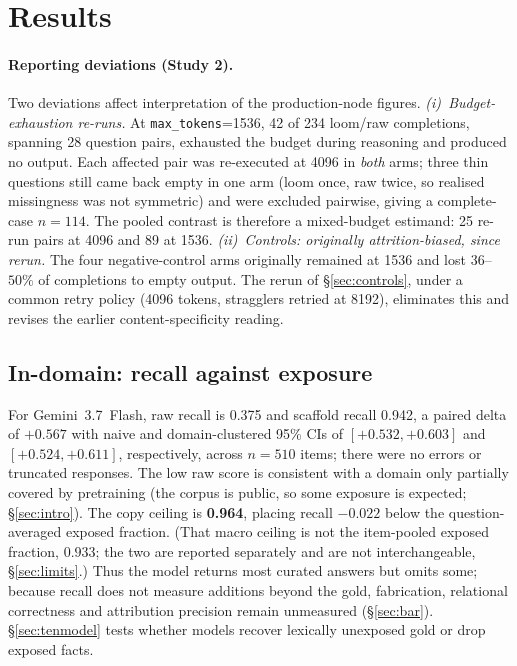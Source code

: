 \documentclass[10pt,twocolumn]{article}
\begin{document}
\section{Results}\label{sec:results}
\paragraph{Reporting deviations (Study 2).} Two deviations affect interpretation of the production-node figures. \emph{(i)~Budget-exhaustion re-runs.} At \texttt{max\_tokens}=1536, 42 of 234 loom/raw completions, spanning 28 question pairs, exhausted the budget during reasoning and produced no output. Each affected pair was re-executed at 4096 in \emph{both} arms; three thin questions still came back empty in one arm (loom once, raw twice, so realised missingness was not symmetric) and were excluded pairwise, giving a complete-case $n=114$. The pooled contrast is therefore a mixed-budget estimand: 25 re-run pairs at 4096 and 89 at 1536. \emph{(ii)~Controls: originally attrition-biased, since rerun.} The four negative-control arms originally remained at 1536 and lost $36$--$50\%$ of completions to empty output. The rerun of \S\ref{sec:controls}, under a common retry policy (4096 tokens, stragglers retried at 8192), eliminates this and revises the earlier content-specificity reading.

\subsection{In-domain: recall against exposure}\label{sec:indomain}
For Gemini~3.7~Flash, raw recall is 0.375 and scaffold recall 0.942, a paired delta of $\mathbf{+0.567}$ with naive and domain-clustered 95\% CIs of $[+0.532,+0.603]$ and $[+0.524,+0.611]$, respectively, across $n=510$ items; there were no errors or truncated responses. The low raw score is consistent with a domain only partially covered by pretraining (the corpus is public, so some exposure is expected; \S\ref{sec:intro}). The copy ceiling is \textbf{0.964}, placing recall $-0.022$ below the question-averaged exposed fraction. (That macro ceiling is not the item-pooled exposed fraction, $0.933$; the two are reported separately and are not interchangeable, \S\ref{sec:limits}.) Thus the model returns most curated answers but omits some; because recall does not measure additions beyond the gold, fabrication, relational correctness and attribution precision remain unmeasured (\S\ref{sec:bar}). \S\ref{sec:tenmodel} tests whether models recover lexically unexposed gold or drop exposed facts.
\end{document}

